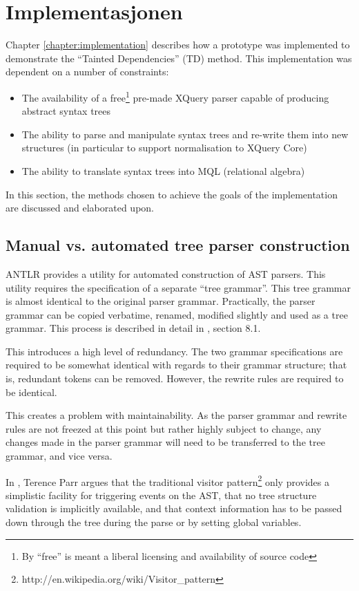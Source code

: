 \section{Implementasjonen}
\label{sect:disc:contextSens}
Chapter \ref{chapter:implementation} describes how a prototype was implemented
to demonstrate the ``Tainted Dependencies'' (TD) method. This implementation
was dependent on a number of constraints:
\begin{itemize}
  \item The availability of a free\footnote{By ``free'' is meant a liberal
  licensing and availability of source code} pre-made XQuery parser capable of
  producing abstract syntax trees
  \item The ability to parse and manipulate syntax trees and re-write them into
  new structures (in particular to support normalisation to XQuery Core)
  \item The ability to translate syntax trees into MQL (relational algebra)
\end{itemize}

In this section, the methods chosen to achieve the goals of the implementation
are discussed and elaborated upon.

\subsection{Manual vs. automated tree parser construction}
ANTLR provides a utility for automated construction of AST parsers. This
utility requires the specification of a separate ``tree grammar''. This tree
grammar is almost identical to the original parser grammar. Practically, the
parser grammar can be copied verbatime, renamed, modified slightly and used as
a tree  grammar. This process is described in detail in \cite{definitiveAntlr},
section 8.1.

This introduces a high level of redundancy. The two grammar specifications are
required to be somewhat identical with regards to their grammar structure; that
is,  redundant tokens can be removed. However, the rewrite rules are required to
be identical.

This creates a problem with maintainability. As the parser grammar and rewrite
rules are not freezed at this point but rather highly subject to change, any
changes made in the parser grammar will need to be transferred to the tree
grammar, and vice versa. 

In \cite{translators_should_use_tree_grammars}, Terence Parr argues that the
traditional visitor
pattern\footnote{http://en.wikipedia.org/wiki/Visitor\_pattern} only provides a
simplistic facility for triggering events on the AST, that no tree structure
validation is implicitly available, and that context information has to be
passed down through the tree during the parse or by setting global variables.

